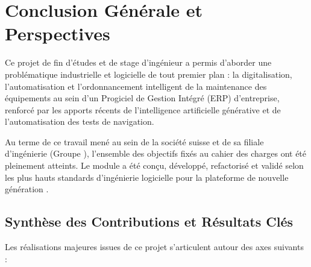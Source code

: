 \chapter*{Conclusion Générale et Perspectives}
\label{chap:conclusion}

Ce projet de fin d'études et de stage d'ingénieur a permis d'aborder une problématique industrielle et logicielle de tout premier plan : la digitalisation, l'automatisation et l'ordonnancement intelligent de la maintenance des équipements au sein d'un Progiciel de Gestion Intégré (ERP) d'entreprise, renforcé par les apports récents de l'intelligence artificielle générative et de l'automatisation des tests de navigation.

Au terme de ce travail mené au sein de la société suisse \textbf{\companyName} et de sa filiale d'ingénierie \textbf{\companySubsidiary} (Groupe \companyGroup), l'ensemble des objectifs fixés au cahier des charges ont été pleinement atteints. Le module \textbf{\odooModule} a été conçu, développé, refactorisé et validé selon les plus hauts standards d'ingénierie logicielle pour la plateforme de nouvelle génération \textbf{\odooVersion}.

\section*{Synthèse des Contributions et Résultats Clés}
Les réalisations majeures issues de ce projet s'articulent autour des axes suivants :


